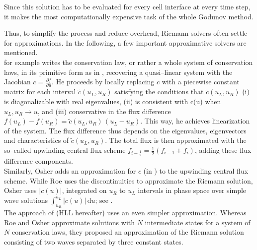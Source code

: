 Since this solution has to be evaluated for every cell interface at every time step, it makes the most computationally expensive task of the whole Godunov method.

Thus, to simplify the process and reduce overhead, Riemann solvers often settle for approximations.
In the following, a few important approximative solvers are mentioned.
\\[6pt]
%
\citet{Roe} for example writes the conservation law, or rather a whole system of conservation laws, in its primitive form as in , recovering a quasi--linear system with the Jacobian $c=\frac{\partial f}{\partial u}$.
He proceeds by locally replacing $c$ with a piecewise constant matrix for each interval $\tilde{c}(u_{L}, u_{R})$ satisfying the conditions that $\tilde{c}(u_{L}, u_{R})$ (i) is diagonalizable with real eigenvalues, (ii) is consistent with c(u) when $u_{L}, u_{R} \to u$, and (iii) conservative in the flux difference $f(u_{L}) - f(u_{R}) = \tilde{c}(u_{L}, u_{R})\,(u_{L} - u_{R})$.
This way, he achieves linearization of the system.
The flux difference thus depends on the eigenvalues, eigenvectors and characteristics of $\tilde{c}(u_{L}, u_{R})$.
The total flux is then approximated with the so--called upwinding central flux scheme $f_{i-\frac{1}{2}} = \frac{1}{2}(f_{i-1} + f_{i})$, adding these flux difference components.
\\[6pt]
%
Similarly, Osher adds an approximation for $c$ (in ) to the upwinding central flux scheme.
While Roe uses the discontinuities to approximate the Riemann solution, Osher uses $\vert c(u)\vert$, integrated on $u_{R}$ to $u_{L}$ intervals in phase space over simple wave solutions $\int_{u_{R}}^{u_{L}}\vert c(u)\vert\,\mathrm{d}u$; see \citet{Osher_Engquist, Osher_Solomon}.
\\[6pt]
%
The approach of \citet{HLL} (HLL hereafter) uses an even simpler approximation.
Whereas Roe and Osher approximate solutions with $N$ intermediate states for a system of $N$ conservation laws, they proposed an approximation of the Riemann solution consisting of two waves separated by three constant states.

